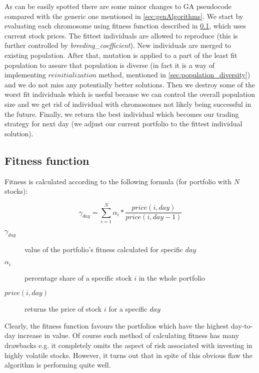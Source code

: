 As can be easily spotted there are some minor changes to GA pseudocode compared with the generic one mentioned in \ref{sec:genAlgorithms}.
We start by evaluating each chromosome using fitness function described in \ref{sec:gen_fitness_fun}, which uses current stock prices.
The fittest individuals are allowed to reproduce (this is further controlled by \emph{breeding\_coefficient}).
New individuals are merged to existing population.
After that, mutation is applied to a part of the least fit population to assure that population is diverse (in fact it is a way of implementing $reinitialization$
method, mentioned in \ref{sec:population_diversity}) and we do not miss any potentially better solutions.
Then we destroy some of the worst fit individuals which is useful because we can control the overall population size and we get rid of individual with chromosomes
not likely being successful in the future.
Finally, we return the best individual which becomes our trading strategy for next day (we adjust our current portfolio to the fittest individual solution). 


\subsection{Fitness function}
\label{sec:gen_fitness_fun}

Fitness is calculated according to the following formula (for portfolio with $N$ stocks):

\begin{equation}
    \gamma_{day} =  \sum_{i=1}^{N} {  \alpha_{i} * \frac{price(i,day)}{price(i,day - 1)} }
\end{equation}

\begin{description}
  \item [$\gamma_{day}$] 
      value of the portfolio's fitness calculated for specific $day$
  \item [$\alpha_{i}$]
      percentage share of a specific stock $i$ in the whole portfolio
  \item [$price(i,day)$]
      returns the price of stock $i$ for a specific $day$
\end{description}

Clearly, the fitness function favours the portfolios which have the highest day-to-day increase in value.
Of course such method of calculating fitness has many drawbacks e.g. it completely omits the aspect of risk associated with investing in highly volatile stocks.
However, it turns out that in spite of this obvious flaw the algorithm is performing quite well.  


